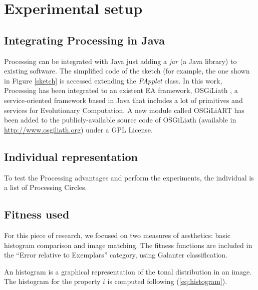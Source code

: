 \documentclass[conference]{IEEEtran}
\begin{document}
\section{Experimental setup}

\subsection{Integrating Processing in Java}
Processing can be integrated with Java just adding a {\em jar} (a Java library) to existing software. The simplified code of the sketch (for example, the one shown in Figure \ref{sketch} is accessed extending the {\em PApplet} class. In this work, Processing has been integrated to an existent EA framework, OSGiLiath \cite{OSGILIATH}, a service-oriented framework based in Java that includes a lot of primitives and services for Evolutionary Computation. A new module called OSGiLiART has been added to the publicly-available source code of OSGiLiath (available in \url{http://www.osgiliath.org}) under a GPL License.

\subsection{Individual representation}

To test the Processing advantages and perform the experiments, the individual is a list of Processing Circles.

\subsection{Fitness used}
For this piece of research, we focused on two measures of aesthetics: basic histogram comparison and image matching. The fitness functions are included in the ``Error relative to Exemplars'' category, using Galanter \cite{galanter2012computational} classification.

An histogram is a graphical representation of the tonal distribution in an image. The histogram for the property $i$ is computed following (\ref{eq:histogram}).
\end{document}
